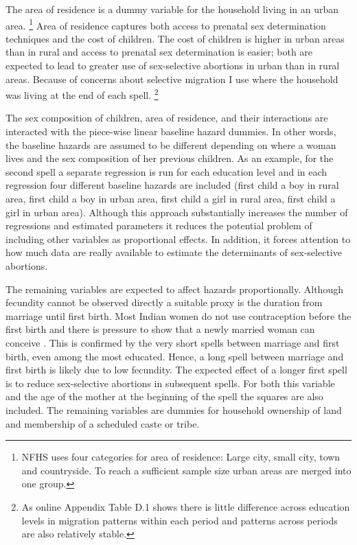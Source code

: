 \documentclass[12pt,letterpaper]{article}
\begin{document}
The area of residence is a dummy variable for the household living in
an urban area.%
\footnote{
NFHS uses four categories for area of residence: Large city, small city, town
and countryside.
To reach a sufficient sample size urban areas are merged into one group.
}
Area of residence captures both access to prenatal sex determination techniques 
and the cost of children.
The cost of children is higher in urban areas than in rural and access to prenatal
sex determination is easier;
both are expected to lead to greater use of sex-selective abortions in urban than 
in rural areas.
Because of concerns about selective migration I use where the household was living
at the end of each spell.%
\footnote{
As online Appendix Table D.1 shows there is little difference across
education levels in migration patterns within each period and patterns across periods
are also relatively stable.
}

The sex composition of children, area of residence, and their interactions
are interacted with the piece-wise linear baseline hazard dummies.
In other words, the baseline hazards are assumed to be different depending on
where a woman lives and the sex composition of her previous children.
As an example, for the second spell a separate regression is
run for each education level and in each regression four different baseline hazards 
are included (first child a boy in rural area, first child a boy in urban area,
first child a girl in rural area, first child a girl in urban area).
Although this approach substantially increases the number of regressions and estimated parameters it
reduces the potential problem of including other variables as proportional effects.
In addition, it forces attention to how much data are really available to estimate
the determinants of sex-selective abortions.

The remaining variables are expected to affect hazards proportionally.
Although fecundity cannot be observed directly a suitable
proxy is the duration from marriage until first birth.
Most Indian women do not use contraception before the first birth
and there is pressure to show that a newly married woman can conceive \citep{dyson83,Sethuraman2007,Dommaraju2009}.
This is confirmed by the very short spells between marriage and first birth,
even among the most educated.
Hence, a long spell between marriage and first birth is likely due to low fecundity.
The expected effect of a longer first spell is to reduce sex-selective abortions in subsequent spells.
For both this variable and the age of the mother at the beginning of the spell the squares are also included.
The remaining variables are dummies for household ownership of land and membership
of a scheduled caste or tribe.
\end{document}
